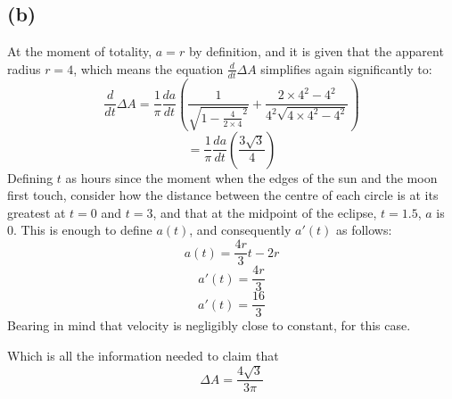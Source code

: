 \documentclass[11pt]{article}
\begin{document}
\subsection*{(b)}
At the moment of totality, $a=r$ by definition, and it is given that the apparent radius $r=4$, which means the equation $\frac{d}{dt}\Delta A$ simplifies again significantly to: 
$$\frac{d}{dt}\Delta A = \frac{1}{\pi}\frac{da}{dt}(\frac{1}{\sqrt{1-\frac{4}{2\times 4}^2}}+\frac{2\times 4^2-4^2}{4^2\sqrt{4\times 4^2-4^2}})$$
$$ = \frac{1}{\pi}\frac{da}{dt}(\frac{3\sqrt{3}}{4})$$
Defining $t$ as hours since the moment when the edges of the sun and the moon first touch, consider how the distance between the centre of each circle is at its greatest at $t=0$ and $t=3$, and that at the midpoint of the eclipse, $t=1.5$, $a$ is 0.
This is enough to define $a(t)$, and consequently $a'(t)$ as follows:
$$a(t)=\frac{4r}{3}t-2r$$
$$a'(t)=\frac{4r}{3}$$
$$a'(t)=\frac{16}{3}$$
Bearing in mind that velocity is negligibly close to constant, for this case. 

Which is all the information needed to claim that
$$\Delta A  = \frac{4\sqrt{3}}{3\pi}$$
\end{document}
